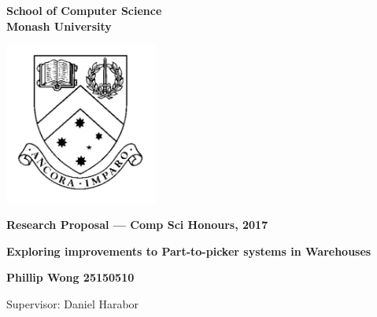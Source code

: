 \documentclass[a4paper,11pt]{article}
\begin{document}
\thispagestyle{empty} %
\renewcommand{\thepage}{\roman{page}}

\begin{spacing}{1.5}
\begin{center}
{\Large \bfseries
School of Computer Science \\
Monash University}

\vspace*{30mm}

\includegraphics[width=5cm]{graphics/MonashCrest.pdf}

\vspace*{15mm}

{\large \bfseries
Research Proposal --- Comp Sci Honours, 2017
}

\vspace*{10mm}

{\LARGE \bfseries
Exploring improvements to Part-to-picker systems in Warehouses 
}

\vspace*{20mm}

{\large \bfseries
Phillip Wong 25150510

\vspace*{20mm}


Supervisor: Daniel Harabor
}

\end{center}
\end{spacing}

\newpage

\tableofcontents

\newpage
\setcounter{page}{1}
\renewcommand{\thepage}{\arabic{page}}
\end{document}
